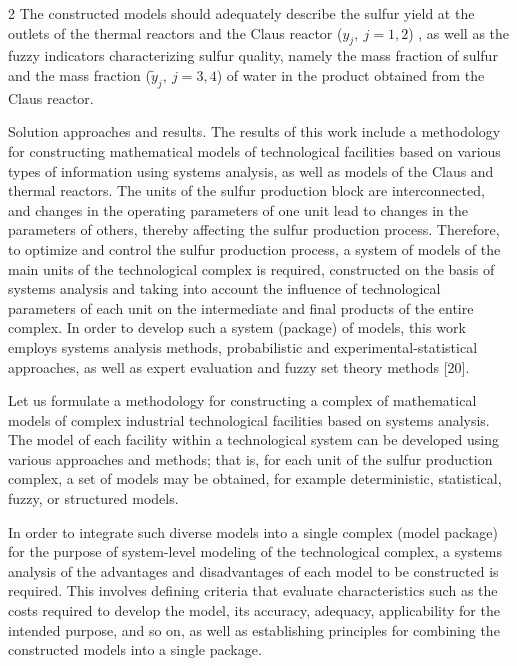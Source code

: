 \begin{multicols}{2}
The constructed models should adequately describe the sulfur yield at
the outlets of the thermal reactors and the Claus reactor (\(y_{j},\ j
= 1,2\)) , as well as the fuzzy indicators characterizing sulfur
quality, namely the mass fraction of sulfur and the mass fraction
(\({\widetilde{y}}_{j},\ j = 3,4\)) of water in the product obtained
from the Claus reactor.

Solution approaches and results. The results of this work include a
methodology for constructing mathematical models of technological
facilities based on various types of information using systems analysis,
as well as models of the Claus and thermal reactors. The units of the
sulfur production block are interconnected, and changes in the operating
parameters of one unit lead to changes in the parameters of others,
thereby affecting the sulfur production process. Therefore, to optimize
and control the sulfur production process, a system of models of the
main units of the technological complex is required, constructed on the
basis of systems analysis and taking into account the influence of
technological parameters of each unit on the intermediate and final
products of the entire complex. In order to develop such a system
(package) of models, this work employs systems analysis methods,
probabilistic and experimental-statistical approaches, as well as expert
evaluation and fuzzy set theory methods {[}20{]}.

Let us formulate a methodology for constructing a complex of
mathematical models of complex industrial technological facilities based
on systems analysis. The model of each facility within a technological
system can be developed using various approaches and methods; that is,
for each unit of the sulfur production complex, a set of models may be
obtained, for example deterministic, statistical, fuzzy, or structured
models.

In order to integrate such diverse models into a single complex (model
package) for the purpose of system-level modeling of the technological
complex, a systems analysis of the advantages and disadvantages of each
model to be constructed is required. This involves defining criteria
that evaluate characteristics such as the costs required to develop the
model, its accuracy, adequacy, applicability for the intended purpose,
and so on, as well as establishing principles for combining the
constructed models into a single package.


\end{multicols}
